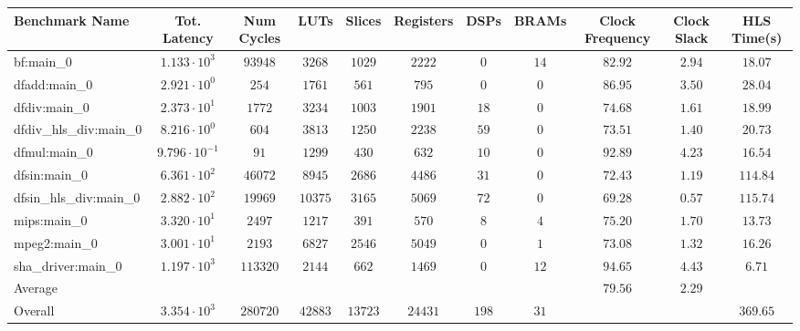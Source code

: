 \begin{tabular}{|l|c|c|c|c|c|c|c|c|c|c|}
\hline
Benchmark Name          & Tot. Latency            & Num Cycles & LUTs      & Slices    & Registers & DSPs    & BRAMs  & Clock Frequency & Clock Slack & HLS Time(s) \\
\hline
bf:main\_0              & $ 1.133 \cdot 10^{3}  $ & $ 93948  $ & $ 3268  $ & $ 1029  $ & $ 2222  $ & $ 0   $ & $ 14 $ & $ 82.92       $ & $ 2.94    $ & $ 18.07   $ \\
dfadd:main\_0           & $ 2.921 \cdot 10^{0}  $ & $ 254    $ & $ 1761  $ & $ 561   $ & $ 795   $ & $ 0   $ & $ 0  $ & $ 86.95       $ & $ 3.50    $ & $ 28.04   $ \\
dfdiv:main\_0           & $ 2.373 \cdot 10^{1}  $ & $ 1772   $ & $ 3234  $ & $ 1003  $ & $ 1901  $ & $ 18  $ & $ 0  $ & $ 74.68       $ & $ 1.61    $ & $ 18.99   $ \\
dfdiv\_hls\_div:main\_0 & $ 8.216 \cdot 10^{0}  $ & $ 604    $ & $ 3813  $ & $ 1250  $ & $ 2238  $ & $ 59  $ & $ 0  $ & $ 73.51       $ & $ 1.40    $ & $ 20.73   $ \\
dfmul:main\_0           & $ 9.796 \cdot 10^{-1} $ & $ 91     $ & $ 1299  $ & $ 430   $ & $ 632   $ & $ 10  $ & $ 0  $ & $ 92.89       $ & $ 4.23    $ & $ 16.54   $ \\
dfsin:main\_0           & $ 6.361 \cdot 10^{2}  $ & $ 46072  $ & $ 8945  $ & $ 2686  $ & $ 4486  $ & $ 31  $ & $ 0  $ & $ 72.43       $ & $ 1.19    $ & $ 114.84  $ \\
dfsin\_hls\_div:main\_0 & $ 2.882 \cdot 10^{2}  $ & $ 19969  $ & $ 10375 $ & $ 3165  $ & $ 5069  $ & $ 72  $ & $ 0  $ & $ 69.28       $ & $ 0.57    $ & $ 115.74  $ \\
mips:main\_0            & $ 3.320 \cdot 10^{1}  $ & $ 2497   $ & $ 1217  $ & $ 391   $ & $ 570   $ & $ 8   $ & $ 4  $ & $ 75.20       $ & $ 1.70    $ & $ 13.73   $ \\
mpeg2:main\_0           & $ 3.001 \cdot 10^{1}  $ & $ 2193   $ & $ 6827  $ & $ 2546  $ & $ 5049  $ & $ 0   $ & $ 1  $ & $ 73.08       $ & $ 1.32    $ & $ 16.26   $ \\
sha\_driver:main\_0     & $ 1.197 \cdot 10^{3}  $ & $ 113320 $ & $ 2144  $ & $ 662   $ & $ 1469  $ & $ 0   $ & $ 12 $ & $ 94.65       $ & $ 4.43    $ & $ 6.71    $ \\
\hline
Average                 & $                     $ & $        $ & $       $ & $       $ & $       $ & $     $ & $    $ & $ 79.56       $ & $ 2.29    $ & $         $ \\
\hline
Overall                 & $ 3.354 \cdot 10^{3}  $ & $ 280720 $ & $ 42883 $ & $ 13723 $ & $ 24431 $ & $ 198 $ & $ 31 $ & $             $ & $         $ & $ 369.65  $ \\
\hline
\end{tabular}
